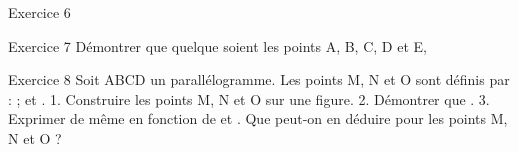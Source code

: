 
Exercice 6

 


Exercice 7
Démontrer que quelque soient les points A, B, C, D et E,  


Exercice 8
Soit ABCD un parallélogramme. Les points M, N et O sont définis par :
 ;  et .
1. Construire les points M, N et O sur une figure.
2. Démontrer que .
3. Exprimer de même  en fonction de  et .
Que peut-on en déduire pour les points M, N et O ?
